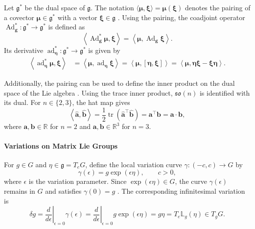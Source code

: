 Let \(\mathfrak{g}^{*}\) be the dual space of \(\mathfrak{g}\). The notation $\langle\bm{\mu},\bm{\xi}\rangle = \bm{\mu}(\bm{\xi})$ denotes the pairing of a covector \(\bm{\mu}\in\mathfrak{g}^{*}\) with a vector \(\bm{\xi}\in\mathfrak{g}\) \cite{Lee2008}. 
Using the pairing, the coadjoint operator \(\operatorname{Ad}_{\bm{g}}^{*}:\mathfrak{g}^{*}\rightarrow\mathfrak{g}^{*}\) is defined as 
\begin{equation}
    \left\langle
        \operatorname{Ad}_{\bm{g}}^{*}\bm{\mu},
        \bm{\xi}
    \right\rangle
    =
    \left\langle
        \bm{\mu},
        \operatorname{Ad}_{\bm{g}}\bm{\xi}
    \right\rangle.
    \label{eq:coadjoint_definition}
\end{equation}
Its derivative \(\operatorname{ad}_{\bm{\eta}}^{*}:\mathfrak{g}^{*}\rightarrow\mathfrak{g}^{*}\) is given by
\begin{align}
    \left\langle\operatorname{ad}_{\bm{\eta}}^{*}\bm{\mu},\bm{\xi}\right\rangle
    &=
    \left\langle\bm{\mu},\operatorname{ad}_{\bm{\eta}}\bm{\xi}\right\rangle
    =
    \left\langle\bm{\mu},[\bm{\eta},\bm{\xi}]\right\rangle
    =
        \left\langle\bm{\mu},\bm{\eta}\bm{\xi} - \bm{\xi}\bm{\eta}\right\rangle
.
    \label{eq:coad_definition}
\end{align}

Additionally, the pairing can be used to define the inner product on the dual space of the Lie algebra \cite{Lee2008}. Using the trace inner product, $\mathfrak{so}(n)$ is identified with its
dual. For $n\in\{2,3\}$, the hat map gives
\begin{equation}
    \left\langle\widehat{\bm a},\widehat{\bm b}\right\rangle
    =
    \frac{1}{2}\operatorname{tr}\!\left(
        \widehat{\bm a}^{\top}\widehat{\bm b}
    \right)
    =
    \bm a^{\top}\bm b = \bm{a} \cdot \bm{b},
    \label{eq:trace_inner_product}
\end{equation}
where $\bm a,\bm b\in\mathbb{R}$ for $n=2$ and
$\bm a,\bm b\in\mathbb{R}^{3}$ for $n=3$.


\paragraph{Variations on Matrix Lie Groups}

For $g\in G$ and $\eta\in\mathfrak{g}=T_eG$, define the local variation
curve $\gamma:(-c,c)\rightarrow G$ by
\begin{equation}
    \gamma(\epsilon)
    =
    g\exp(\epsilon\eta),
    \qquad c>0,
    \label{eq:variation_curve_matrix_lie_group}
\end{equation}
where $\epsilon$ is the variation parameter. Since
$\exp(\epsilon\eta)\in G$, the curve $\gamma(\epsilon)$ remains in
$G$ and satisfies $\gamma(0)=g$ \cite{Lee2008}. The corresponding
infinitesimal variation is
\begin{equation}
    \delta g
    =
    \left.
    \frac{d}{d\epsilon}
    \right|_{\epsilon=0}
    \gamma(\epsilon)
    =
    \left.
    \frac{d}{d\epsilon}
    \right|_{\epsilon=0}
    g\exp(\epsilon\eta)
    =
    g\eta
    =
    T_e\mathbb{L}_g(\eta)
    \in T_gG.
    \label{eq:infinitesimal_variation_matrix_lie_group}
\end{equation}


